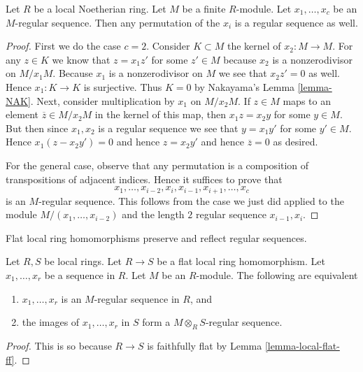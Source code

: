 \begin{lemma}
\label{lemma-permute-xi}
Let $R$ be a local Noetherian ring.
Let $M$ be a finite $R$-module.
Let $x_1, \ldots, x_c$ be an $M$-regular sequence.
Then any permutation of the $x_i$ is a regular
sequence as well.
\end{lemma}

\begin{proof}
First we do the case $c = 2$.
Consider $K \subset M$ the kernel of $x_2 : M \to M$.
For any $z \in K$ we know that $z = x_1 z'$
for some $z' \in M$ because
$x_2$ is a nonzerodivisor on $M/x_1M$.
Because $x_1$ is a nonzerodivisor on $M$ we see that $x_2 z' = 0$
as well. Hence $x_1 : K \to K$ is surjective.
Thus $K = 0$ by Nakayama's Lemma \ref{lemma-NAK}.
Next, consider multiplication by $x_1$ on $M/x_2M$.
If $z \in M$ maps to an element $\overline{z} \in M/x_2M$
in the kernel of this map, then $x_1 z = x_2 y$ for some $y \in M$.
But then since $x_1, x_2$ is a regular sequence we see that
$y = x_1 y'$ for some $y' \in M$. Hence $x_1 ( z - x_2 y' ) =0$
and hence $z = x_2 y'$ and hence $\overline{z} = 0$ as desired.

\medskip\noindent
For the general case, observe that any permutation is
a composition of transpositions of adjacent indices.
Hence it suffices to prove that
$$
x_1, \ldots, x_{i-2}, x_i, x_{i-1}, x_{i + 1}, \ldots, x_c
$$
is an $M$-regular sequence. This follows from the case we
just did applied to the module $M/(x_1, \ldots, x_{i-2})$
and the length $2$ regular sequence $x_{i-1}, x_i$.
\end{proof}

\begin{lemma}
\label{lemma-flat-increases-depth}
\begin{slogan}
Flat local ring homomorphisms preserve and reflect regular sequences.
\end{slogan}
Let $R, S$ be local rings. Let $R \to S$ be a flat local ring homomorphism.
Let $x_1, \ldots, x_r$ be a sequence in $R$. Let $M$ be an $R$-module.
The following are equivalent
\begin{enumerate}
\item $x_1, \ldots, x_r$ is an $M$-regular sequence in $R$, and
\item the images of $x_1, \ldots, x_r$ in $S$ form a $M \otimes_R S$-regular
sequence.
\end{enumerate}
\end{lemma}

\begin{proof}
This is so because $R \to S$ is faithfully flat
by Lemma \ref{lemma-local-flat-ff}.
\end{proof}

